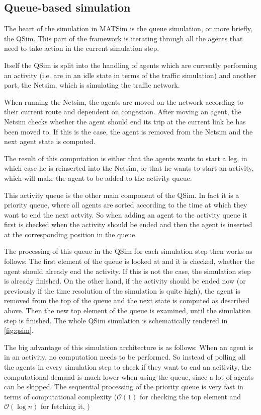 \subsection{Queue-based simulation}

The heart of the simulation in MATSim is the queue simulation, or more briefly,
the QSim. This part of the framework is iterating through all the agents that need
to take action in the current simulation step.

Itself the QSim is split into the handling of agents which are currently performing
an activity (i.e. are in an idle state in terms of the traffic simulation) and another
part, the Netsim, which is simulating the traffic network.

When running the Netsim, the agents are moved on the network according to their
current route and dependent on congestion. After moving an agent, the Netsim checks
whether the agent should end its trip at the current link he has been moved to. If
this is the case, the agent is removed from the Netsim and the next agent state is computed.

The result of this computation is either that the agents wants to start a leg, in
which case he is reinserted into the Netsim, or that he wants to start an activity,
which will make the agent to be added to the activity queue.

This activity queue is the other main component of the QSim. In fact it is a
priority queue, where all agents are sorted according to the time at which they
want to end the next actvity. So when adding an agent to the activity queue it first
is checked when the activity should be ended and then the agent is inserted at the
corresponding position in the queue.

The processing of this queue in the QSim for each simulation step then works as
follows: The first element of the queue is looked at and it is checked, whether the
agent should already end the activity. If this is not the case, the simulation step
is already finished. On the other hand, if the activity should be ended now (or
previously if the time resolution of the simulation is quite high), the agent is
removed from the top of the queue and the next state is computed as described above.
Then the new top element of the queue is examined, until the simulation step is
finished. The whole QSim simulation is schematically rendered in \cref{fig:qsim}.

The big advantage of this simulation architecture is as follows: When an agent is
in an activity, no computation needs to be performed. So instead of polling all
the agents in every simulation step to check if they want to end an acitivity, the
computational demand is much lower when using the queue, since a lot of agents can
be skipped. The sequential processing of the priority queue is very fast in terms
of computational complexity ($\mathcal{O}(1)$ for checking the top element
and $\mathcal{O}(\log n)$ for fetching it, \citet{JavaPQ})

